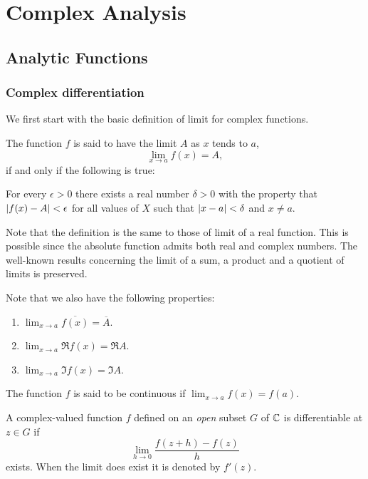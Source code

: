\documentclass[main.tex]{subfiles}
\begin{document}
\chapter{Complex Analysis}
	\section{Analytic Functions}
	\subsection{Complex differentiation}
	We first start with the basic definition of limit for complex functions.
	\begin{definition}
		The function $f$ is said to have the limit $A$ as $x$ tends to $a$,
		\begin{equation*}
			\lim_{x\to a} f(x) = A,
		\end{equation*}
		if and only if the following is true:
		
		For every $\epsilon > 0$ there exists a real number $\delta > 0$ with the property that $\lvert f(x) - A\rvert < \epsilon$ for all values of $X$ such that $\lvert x - a\rvert < \delta$ and $x \neq a$.
	\end{definition}
	Note that the definition is the same to those of limit of a real function. This is possible since the absolute function admits both real and complex numbers. The well-known results concerning the limit of a sum, a product and a quotient of limits is preserved.
	
	Note that we also have the following properties:
	\begin{enumerate}
		\item $\lim_{x \to a} \overline{f(x)} = \overline{A}$.
		\item $\lim_{x \to a} \Re f(x) = \Re A$.
		\item $\lim_{x \to a} \Im f(x) = \Im A$.
	\end{enumerate}
	\begin{definition}
		The function $f$ is said to be continuous if $\lim_{x \to a} f(x) = f(a)$.
	\end{definition}
	\begin{definition}
		A complex-valued function $f$ defined on an \textit{open} subset $G$ of $\mathbb C$ is differentiable at $z\in G$ if
		\begin{equation*}
			\lim_{h\to 0} \frac{f(z + h) - f(z)}{h}
		\end{equation*}
		exists. When the limit does exist it is denoted by $f'(z)$.
	\end{definition}
\end{document}
